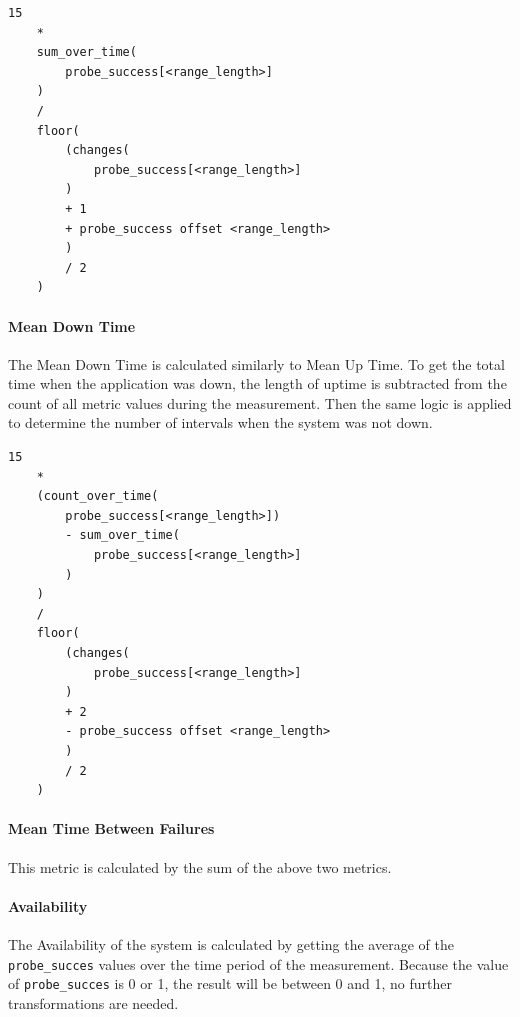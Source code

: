  \vspace{0.5cm}
 \begin{minipage}{\linewidth}
 	\begin{lstlisting}[caption={Mean Up Time defined in PromQL}, label={lst:promql-mut}]
 	15
 	* 
 	sum_over_time(
 		probe_success[<range_length>]
 	)
 	/ 
 	floor(
 		(changes(
 			probe_success[<range_length>]
 		)
 		+ 1
 		+ probe_success offset <range_length>
 		)
 		/ 2
 	)\end{lstlisting}
 \end{minipage}
 
 \paragraph{Mean Down Time} The Mean Down Time is calculated similarly to Mean Up Time. To get the total time when the application was down, the length of uptime is subtracted from the count of all metric values during the measurement. Then the same logic is applied to determine the number of intervals when the system was not down.
 
 \vspace{0.5cm}
 \begin{minipage}{\linewidth}
 	\begin{lstlisting}[caption={Mean Up Time defined in PromQL}, label={lst:promql-mut}]
 	15 
 	* 
 	(count_over_time(
 		probe_success[<range_length>])
 		- sum_over_time(
 			probe_success[<range_length>]
 		)
 	)
 	/ 
 	floor(
 		(changes(
 			probe_success[<range_length>]
 		)
 		+ 2
 		- probe_success offset <range_length>
 		)
 		/ 2
 	)\end{lstlisting}
 \end{minipage}
 
 \paragraph{Mean Time Between Failures} This metric is calculated by the sum of the above two metrics.
 
 \paragraph{Availability} The Availability of the system is calculated by getting the average of the \texttt{probe\_succes} values over the time period of the measurement. Because the value of \texttt{probe\_succes} is 0 or 1, the result will be between 0 and 1, no further transformations are needed.
 
